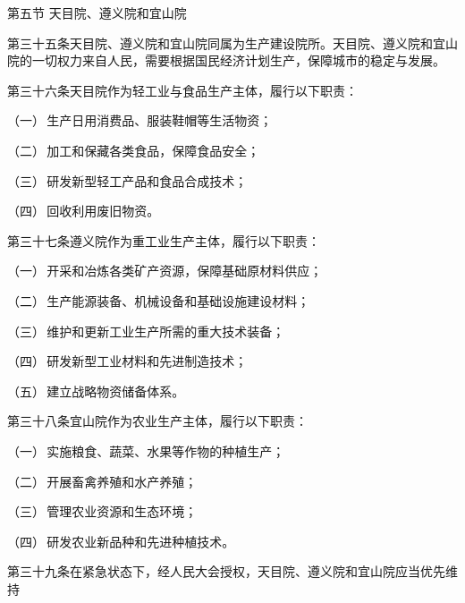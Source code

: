 {\vspace{0.6\baselineskip}

第五节\,\,天目院、遵义院和宜山院

\vspace{0.6\baselineskip}

\noindent 第三十五条\quad 天目院、遵义院和宜山院同属为生产建设院所。天目院、遵义院和宜山院的一切权力来自人民，需要根据国民经济计划生产，保障城市的稳定与发展。

\noindent 第三十六条\quad 天目院作为轻工业与食品生产主体，履行以下职责：

\hspace*{2em}（一）\,生产日用消费品、服装鞋帽等生活物资；

\hspace*{2em}（二）\,加工和保藏各类食品，保障食品安全；

\hspace*{2em}（三）\,研发新型轻工产品和食品合成技术；

\hspace*{2em}（四）\,回收利用废旧物资。

\noindent 第三十七条\quad 遵义院作为重工业生产主体，履行以下职责：

\hspace*{2em}（一）\,开采和冶炼各类矿产资源，保障基础原材料供应；

\hspace*{2em}（二）\,生产能源装备、机械设备和基础设施建设材料；

\hspace*{2em}（三）\,维护和更新工业生产所需的重大技术装备；

\hspace*{2em}（四）\,研发新型工业材料和先进制造技术；

\hspace*{2em}（五）\,建立战略物资储备体系。

\noindent 第三十八条\quad 宜山院作为农业生产主体，履行以下职责：

\hspace*{2em}（一）\,实施粮食、蔬菜、水果等作物的种植生产；

\hspace*{2em}（二）\,开展畜禽养殖和水产养殖；

\hspace*{2em}（三）\,管理农业资源和生态环境；

\hspace*{2em}（四）\,研发农业新品种和先进种植技术。

\noindent 第三十九条\quad 在紧急状态下，经人民大会授权，天目院、遵义院和宜山院应当优先维持

}
